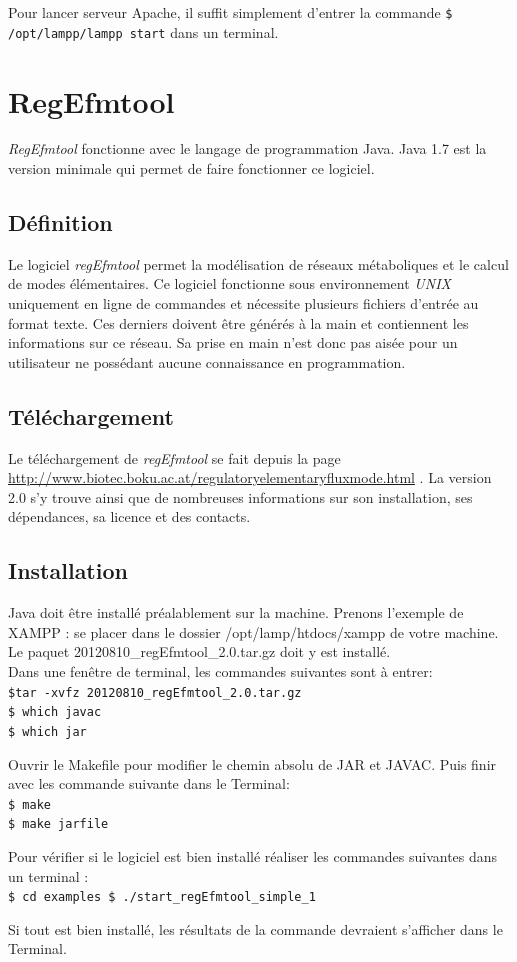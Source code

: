 \documentclass[12pt,a4paper]{report}
\begin{document}
Pour lancer serveur Apache, il suffit simplement d'entrer la commande \texttt{\$ /opt/lampp/lampp start} dans un terminal.
\chapter{RegEfmtool}

\textit{RegEfmtool} fonctionne avec le langage de programmation Java. Java 1.7 est la version minimale qui permet de faire fonctionner ce logiciel.

\section{Définition}

Le logiciel \textit{regEfmtool} permet la modélisation de réseaux métaboliques et le calcul de modes élémentaires. Ce logiciel fonctionne sous environnement \emph{UNIX} uniquement en ligne de commandes et nécessite plusieurs fichiers d'entrée au format texte. Ces derniers doivent être générés à la main et contiennent les informations sur ce réseau. Sa prise en main n'est donc pas aisée pour un utilisateur ne possédant aucune connaissance en programmation.\\


\section{Téléchargement}

Le téléchargement de \textit{regEfmtool} se fait depuis la page \url{http://www.biotec.boku.ac.at/regulatoryelementaryfluxmode.html} . La version 2.0 s'y trouve ainsi que de nombreuses informations sur son installation, ses dépendances, sa licence et des contacts.

\section{Installation}

Java doit être installé préalablement sur la machine. Prenons l'exemple de XAMPP : se placer dans le dossier /opt/lamp/htdocs/xampp de votre machine. Le paquet 20120810\_regEfmtool\_2.0.tar.gz doit y est installé. \\
Dans une fenêtre de terminal, les commandes suivantes sont à entrer:\\
\texttt{\$tar -xvfz 20120810\_regEfmtool\_2.0.tar.gz\\
\$ which javac\\
\$ which jar\\}

Ouvrir le Makefile pour modifier le chemin absolu de JAR et JAVAC. Puis finir avec les commande suivante dans le Terminal:\\
\texttt{\$ make\\
\$ make jarfile\\}

Pour vérifier si le logiciel est bien installé réaliser les commandes suivantes dans un terminal :\\
\texttt{\$ cd examples
\$ ./start\_regEfmtool\_simple\_1}

Si tout est bien installé, les résultats de la commande devraient s'afficher dans le Terminal.
\end{document}
